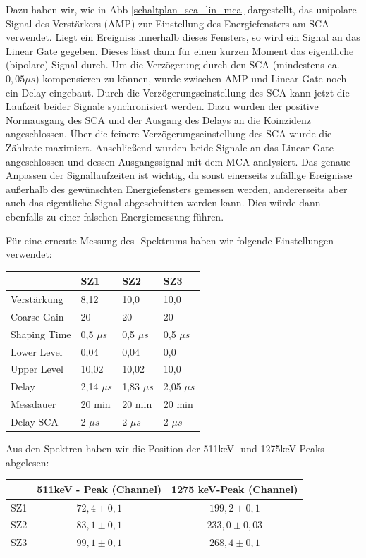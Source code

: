 Dazu haben wir, wie in Abb \ref{schaltplan_sca_lin_mca} dargestellt, das unipolare Signal des Verstärkers (AMP) zur Einstellung des Energiefensters am SCA verwendet. Liegt ein Ereigniss innerhalb dieses Fensters, so wird ein Signal an das Linear Gate gegeben. Dieses lässt dann für einen kurzen Moment das eigentliche (bipolare) Signal durch. Um die Verzögerung durch den SCA (mindestens ca. $0,05\mu s$) kompensieren zu können, wurde zwischen AMP und Linear Gate noch ein Delay eingebaut. Durch die Verzögerungseinstellung des SCA kann jetzt die Laufzeit beider Signale synchronisiert werden. Dazu wurden der positive Normausgang des SCA und der Ausgang des Delays an die Koinzidenz angeschlossen. Über die feinere Verzögerungseinstellung des SCA wurde die Zählrate maximiert. Anschließend wurden beide Signale an das Linear Gate angeschlossen und dessen Ausgangssignal mit dem MCA analysiert. Das genaue Anpassen der Signallaufzeiten ist wichtig, da sonst einerseits zufällige Ereignisse außerhalb des gewünschten Energiefensters gemessen werden, andererseits aber auch das eigentliche Signal abgeschnitten werden kann. Dies würde dann ebenfalls zu einer falschen Energiemessung führen.

Für eine erneute Messung des \Na-Spektrums haben wir folgende Einstellungen verwendet:
\begin{center}
\begin{tabular}{llll}
\toprule
 & SZ1 & SZ2 & SZ3\\
\midrule
Verstärkung & 8,12 & 10,0 & 10,0\\
Coarse Gain & 20 & 20 & 20\\
Shaping Time & 0,5 $\mu s$ & 0,5 $\mu s$ & 0,5 $\mu s$\\
Lower Level & 0,04 & 0,04 & 0,0\\
Upper Level & 10,02 & 10,02 & 10,0\\
Delay & 2,14 $\mu s$ & 1,83 $\mu s$ & 2,05 $\mu s$\\
Messdauer & 20 min & 20 min & 20 min\\
Delay SCA & 2 $\mu s$ & 2 $\mu s$ & 2 $\mu s$\\
\bottomrule
\end{tabular}
\end{center}

Aus den Spektren haben wir die Position der 511keV- und 1275keV-Peaks abgelesen: %
\begin{center}
\begin{tabular}{lcc}
\toprule
 & 511keV - Peak (Channel) & 1275 keV-Peak (Channel) \\
\midrule
SZ1 & $72,4 \pm 0,1$ & $199,2 \pm 0,1$ \\
SZ2 & $83,1 \pm 0,1$ & $233,0 \pm 0,03$ \\
SZ3 & $99,1 \pm 0,1$ & $268,4 \pm 0,1$ \\
\bottomrule 
\end{tabular}
\end{center}

